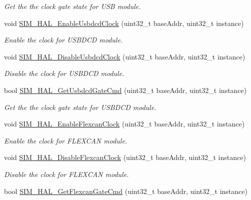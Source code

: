 \begin{DoxyCompactItemize}
\begin{DoxyCompactList}\small\item\em Get the the clock gate state for U\+SB module. \end{DoxyCompactList}\item 
void \hyperlink{group__sim__hal_gaab742f0d175da7310e2b42969b689eb0}{S\+I\+M\+\_\+\+H\+A\+L\+\_\+\+Enable\+Usbdcd\+Clock} (uint32\+\_\+t base\+Addr, uint32\+\_\+t instance)
\begin{DoxyCompactList}\small\item\em Enable the clock for U\+S\+B\+D\+CD module. \end{DoxyCompactList}\item 
void \hyperlink{group__sim__hal_gae2f50fcbd9247f5a5f72836cfce1d612}{S\+I\+M\+\_\+\+H\+A\+L\+\_\+\+Disable\+Usbdcd\+Clock} (uint32\+\_\+t base\+Addr, uint32\+\_\+t instance)
\begin{DoxyCompactList}\small\item\em Disable the clock for U\+S\+B\+D\+CD module. \end{DoxyCompactList}\item 
bool \hyperlink{group__sim__hal_gac8fc6b05e0d1595875560df395423f6d}{S\+I\+M\+\_\+\+H\+A\+L\+\_\+\+Get\+Usbdcd\+Gate\+Cmd} (uint32\+\_\+t base\+Addr, uint32\+\_\+t instance)
\begin{DoxyCompactList}\small\item\em Get the the clock gate state for U\+S\+B\+D\+CD module. \end{DoxyCompactList}\item 
void \hyperlink{group__sim__hal_ga5e2cf69480e558f97834f64c9b27bbed}{S\+I\+M\+\_\+\+H\+A\+L\+\_\+\+Enable\+Flexcan\+Clock} (uint32\+\_\+t base\+Addr, uint32\+\_\+t instance)
\begin{DoxyCompactList}\small\item\em Enable the clock for F\+L\+E\+X\+C\+AN module. \end{DoxyCompactList}\item 
void \hyperlink{group__sim__hal_gaa335c528a1d07f5a8fdee7a362d64da9}{S\+I\+M\+\_\+\+H\+A\+L\+\_\+\+Disable\+Flexcan\+Clock} (uint32\+\_\+t base\+Addr, uint32\+\_\+t instance)
\begin{DoxyCompactList}\small\item\em Disable the clock for F\+L\+E\+X\+C\+AN module. \end{DoxyCompactList}\item 
bool \hyperlink{group__sim__hal_ga5be8cd2010ad45d3da3a1aa46a2bb450}{S\+I\+M\+\_\+\+H\+A\+L\+\_\+\+Get\+Flexcan\+Gate\+Cmd} (uint32\+\_\+t base\+Addr, uint32\+\_\+t instance)

\end{DoxyCompactItemize}
